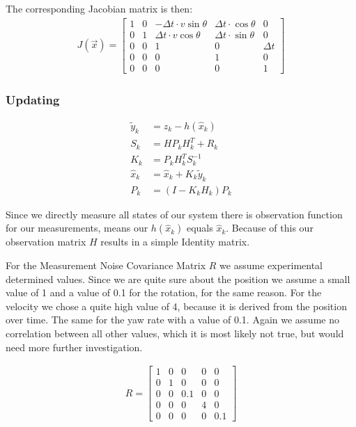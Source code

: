 \documentclass[11pt,oneside,openright]{mpreport}
\begin{document}
The corresponding Jacobian matrix is then:
\begin{align*}
J(\vec{x})=
\begin{bmatrix}
1 & 0 & -\Delta t \cdot v \sin{\theta} & \Delta t \cdot \cos{\theta} & 0\\
0 & 1 & \Delta t \cdot v \cos{\theta} & \Delta t \cdot \sin{\theta}  & 0\\
0 & 0 & 1 & 0 & \Delta t\\
0 & 0 & 0 & 1 & 0\\
0 & 0 & 0 & 0 & 1
\end{bmatrix} 
\end{align*}



\subsubsection{Updating}

\begin{align*}
\tilde{y}_k &= z_k -h(\hat{x}_{k})\\
S_k &= H P_k H^T_k + R_k\\
K_k &= P_k H^T_k S_k^{-1}\\
\hat{x}_k &= \hat{x}_k + K_k \tilde{y}_k\\
P_k &= (I - K_k H_k) P_k
\end{align*}


Since we directly measure all states of our system there is observation function for our measurements, means our
$h(\hat{x}_k)$ equals $\hat{x}_k$. Because of this our observation matrix $H$ results in a simple Identity matrix.

For the Measurement Noise Covariance Matrix $R$ we assume experimental determined values. Since we are quite sure about the position we
assume a small value of 1 and a value of 0.1 for the rotation, for the same reason. For the velocity we chose a quite high value of 4,
because it is derived from the position over time. The same for the yaw rate with a value of 0.1. Again we assume no correlation between all other values,
which it is most likely not true, but would need more further investigation.

\begin{align*}
R=
\begin{bmatrix}
1 & 0 & 0 & 0 & 0\\
0 & 1 & 0 & 0 & 0\\
0 & 0 & 0.1 & 0 & 0\\
0 & 0 & 0 & 4 & 0\\
0 & 0 & 0 & 0 & 0.1
\end{bmatrix} 
\end{align*}
\end{document}
